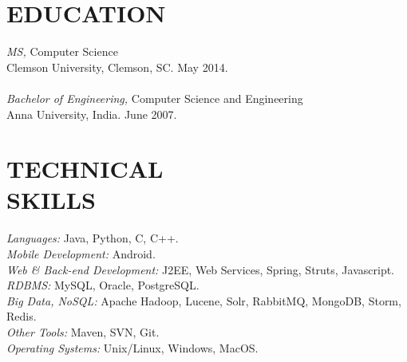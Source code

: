 \documentclass[line,margin]{res}
\begin{document}
	
	\address{2050 Southwest Expressway, Apt 82, San Jose, CA 95126}
	\address{gnanesh.che@gmail.com $\mid$ (864) 633-9988}
	
	
	\begin{resume}
		
		
		\section{EDUCATION} 
		{\sl MS,} Computer Science \\
		Clemson University, Clemson, SC. 
		May 2014.\\\\
		{\sl Bachelor of Engineering,} Computer Science and Engineering \\
		Anna University, India.
		June 2007.
		
		
		\section{TECHNICAL \\ SKILLS} {\sl Languages:} Java, Python, C, C++.\\
		{\sl Mobile Development:} Android. \\
		{\sl Web \& Back-end Development:} J2EE, Web Services, Spring, Struts, Javascript. \\
		{\sl RDBMS:} MySQL, Oracle, PostgreSQL. \\
		{\sl Big Data, NoSQL:} Apache Hadoop, Lucene, Solr, RabbitMQ, MongoDB, Storm, Redis. \\
		{\sl Other Tools:} Maven, SVN, Git. \\
		{\sl Operating Systems:}  Unix/Linux, Windows, MacOS.
		

\end{resume}
\end{document}
